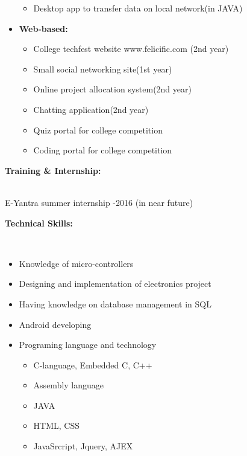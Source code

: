 \documentclass[12pt,a4paper,english]{article}
\begin{document}
\begin{flushleft}
\begin{itemize}
\begin{itemize}
				\item Desktop app to transfer data on local network(in JAVA)
			\end{itemize}
			\item	\textbf{Web-based:}\\
			\begin{itemize}
				\item College techfest website www.felicific.com (2nd year)
				\item Small social networking site(1st year)
				\item Online project allocation system(2nd year)
				\item Chatting application(2nd year)
				\item Quiz portal for college competition
				\item Coding portal for college competition
			\end{itemize}
		\end{itemize}
		\vspace{0.3in}
		\begin{Large}
			\textbf{Training \& Internship:}
		\end{Large}\\
		\vspace{0.12in}
		\hspace{0.72in}E-Yantra summer internship -2016 (in near future)\\
		\vspace{0.3in}
		\begin{Large}
			\textbf{Technical Skills:}
		\end{Large}\\
		\hspace{0.72in}
		\begin{itemize}
			\item Knowledge of micro-controllers
			\item Designing and implementation of electronics project
			\item Having knowledge on database management in SQL
			\item Android developing
			\item Programing language and technology
			\begin{itemize}
				\item C-language, Embedded C, C++
				\item Assembly language
				\item JAVA
				\item HTML, CSS
				\item JavaSrcript, Jquery, AJEX

\end{itemize}
\end{itemize}
\end{flushleft}
\end{document}

